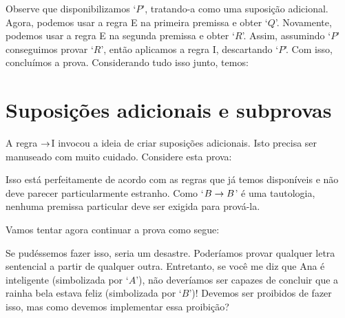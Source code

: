 \begin{fitchproof}
	\open
	\close
\end{fitchproof}
Observe que disponibilizamos `$P$',  tratando-a como uma suposição adicional.  
Agora, podemos usar a regra  {\eif}E na primeira premissa e obter `$Q$'. Novamente, podemos usar  a regra {\eif}E na segunda premissa e obter `$R$'. Assim, assumindo `$P$'  conseguimos provar `$R$',   então aplicamos a regra {\eif}I, descartando `$P$'.  Com isso, concluímos a prova.  Considerando tudo isso junto, temos: 


\label{HSproof}
\begin{fitchproof}
	\open
	\close
\end{fitchproof}


\section{Suposições adicionais  e subprovas}
A regra $\rightarrow$I invocou a ideia de criar  suposições adicionais.   Isto precisa ser manuseado com muito cuidado. Considere esta prova:
\begin{fitchproof}
	\open
		 
	\close
\end{fitchproof}
Isso está perfeitamente de acordo com as regras  que já temos disponíveis e não deve parecer particularmente estranho.   Como `$B \rightarrow B$'  é uma tautologia, nenhuma premissa particular deve ser exigida para prová-la.

Vamos tentar agora continuar a prova como segue: 


\begin{fitchproof}
	\open
		 
	\close
	 
	 
\end{fitchproof}
Se pudéssemos fazer isso, seria um desastre. Poderíamos provar qualquer  letra sentencial a partir de qualquer outra. Entretanto, se  você me diz que Ana é inteligente  (simbolizada por `$A$'),  não deveríamos ser capazes de concluir que a rainha bela estava feliz (simbolizada por `$B$')!   Devemos ser proibidos de fazer isso, mas como devemos implementar essa proibição?


